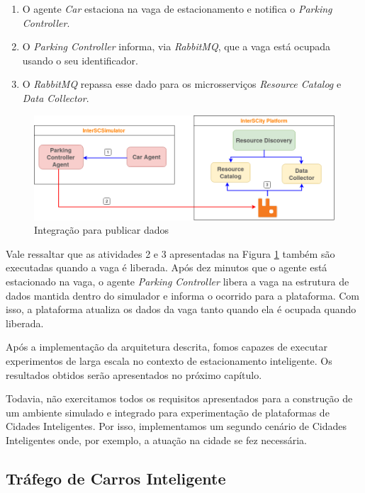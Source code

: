 \begin{enumerate}
    \item O agente \textit{Car} estaciona na vaga de estacionamento e notifica o \textit{Parking Controller}.

	\item O \textit{Parking Controller} informa, via \textit{RabbitMQ}, que a vaga está ocupada usando o seu identificador.

	\item O \textit{RabbitMQ} repassa esse dado para os microsserviços \textit{Resource Catalog} e \textit{Data Collector}.
\end{enumerate}

\begin{figure}[ht]
	\centering
	\includegraphics[width=\textwidth]{figuras/integration_publish_data_smart_parking.png}
	\caption{Integração para publicar dados}
	\label{fig:atualizacao}
\end{figure}

Vale ressaltar que as atividades 2 e 3 apresentadas na Figura \ref{fig:atualizacao} também são executadas quando a vaga é liberada.
Após dez minutos que o agente está estacionado na vaga, o agente \textit{Parking Controller} libera a vaga na estrutura de dados mantida dentro do simulador e informa o
ocorrido para a plataforma.
Com isso, a plataforma atualiza os dados da vaga tanto quando ela é ocupada quando liberada.

Após a implementação da arquitetura descrita, fomos capazes de executar experimentos de larga escala no contexto de estacionamento inteligente.
Os resultados obtidos serão apresentados no próximo capítulo.

Todavia, não exercitamos todos os requisitos apresentados para a construção de um ambiente simulado e integrado para experimentação de plataformas de Cidades Inteligentes.
Por isso, implementamos um segundo cenário de Cidades Inteligentes onde, por exemplo, a atuação na cidade se fez necessária.


\subsection{Tráfego de Carros Inteligente}
\label{sec:smart_traffic}


